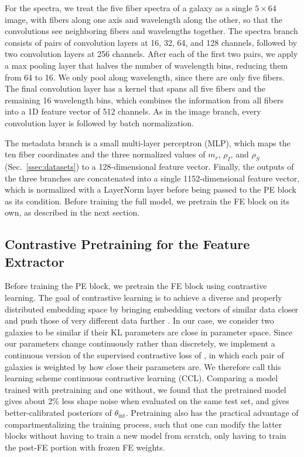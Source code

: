 For the spectra, we treat the five fiber spectra of a galaxy as a single $5\times64$ image, with fibers along one axis and wavelength along the other, so that the convolutions see neighboring fibers and wavelengths together. The spectra branch consists of pairs of convolution layers at 16, 32, 64, and 128 channels, followed by two convolution layers at 256 channels. After each of the first two pairs, we apply a max pooling layer that halves the number of wavelength bins, reducing them from 64 to 16. We only pool along wavelength, since there are only five fibers. The final convolution layer has a kernel that spans all five fibers and the remaining 16 wavelength bins, which combines the information from all fibers into a 1D feature vector of 512 channels. As in the image branch, every convolution layer is followed by batch normalization.

The metadata branch is a small multi-layer perceptron (MLP), which maps the ten fiber coordinates and the three normalized values of $m_r$, $\rho_I$, and $\rho_S$ (Sec.~\ref{ssec:datasets}) to a 128-dimensional feature vector. Finally, the outputs of the three branches are concatenated into a single 1152-dimensional feature vector, which is normalized with a LayerNorm layer before being passed to the PE block as its condition. Before training the full model, we pretrain the FE block on its own, as described in the next section.

\subsection{Contrastive Pretraining for the Feature Extractor}
\label{ssec:pretrain}
Before training the PE block, we pretrain the FE block using contrastive learning. The goal of contrastive learning is to achieve a diverse and properly distributed embedding space by bringing embedding vectors of similar data closer and push those of very different data further \citep{SimCLR, SupCon}. In our case, we consider two galaxies to be similar if their KL parameters are close in parameter space. Since our parameters change continuously rather than discretely, we implement a continuous version of the supervised contrastive loss of \citep{SupCon}, in which each pair of galaxies is weighted by how close their parameters are. We therefore call this learning scheme continuous contrastive learning (CCL). Comparing a model trained with pretraining and one without, we found that the pretrained model gives about 2\% less shape noise when evaluated on the same test set, and gives better-calibrated posteriors of $\theta_\mathrm{int}$. Pretraining also has the practical advantage of compartmentalizing the training process, such that one can modify the latter blocks without having to train a new model from scratch, only having to train the post-FE portion with frozen FE weights.

